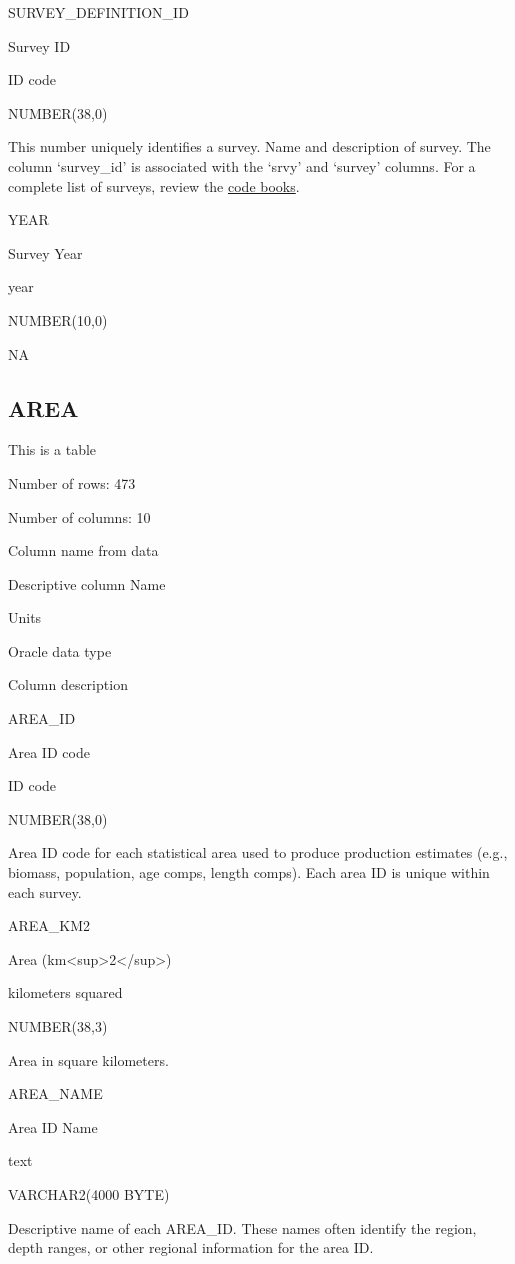 \documentclass[
  letterpaper,
  oneside,
  open=any]{scrbook}
\begin{document}
SURVEY\_DEFINITION\_ID

Survey ID

ID code

NUMBER(38,0)

This number uniquely identifies a survey. Name and description of
survey. The column `survey\_id' is associated with the `srvy' and
`survey' columns. For a complete list of surveys, review the
\href{https://www.fisheries.noaa.gov/resource/document/groundfish-survey-species-code-manual-and-data-codes-manual}{code
books}.

YEAR

Survey Year

year

NUMBER(10,0)

NA

\hypertarget{area}{%
\subsection{AREA}\label{area}}

This is a table

Number of rows: 473

Number of columns: 10

Column name from data

Descriptive column Name

Units

Oracle data type

Column description

AREA\_ID

Area ID code

ID code

NUMBER(38,0)

Area ID code for each statistical area used to produce production
estimates (e.g., biomass, population, age comps, length comps). Each
area ID is unique within each survey.

AREA\_KM2

Area (km\textless sup\textgreater2\textless/sup\textgreater)

kilometers squared

NUMBER(38,3)

Area in square kilometers.

AREA\_NAME

Area ID Name

text

VARCHAR2(4000 BYTE)

Descriptive name of each AREA\_ID. These names often identify the
region, depth ranges, or other regional information for the area ID.
\end{document}
